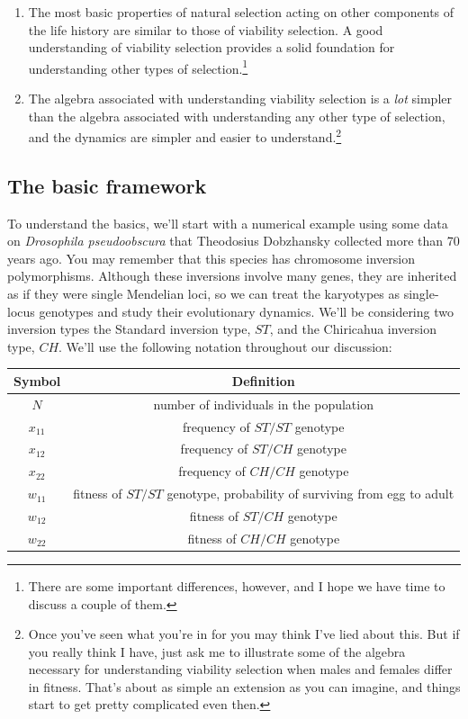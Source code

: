 \documentclass[12pt]{article}
\begin{document}
\begin{enumerate}

\item The most basic properties of natural selection acting on other
  components of the life history are similar to those of viability
  selection. A good understanding of viability selection provides a
  solid foundation for understanding other types of
  selection.\footnote{There are some important differences, however,
    and I hope we have time to discuss a couple of them.}

\item The algebra associated with understanding viability selection is
  a {\it lot\/} simpler than the algebra associated with understanding
  any other type of selection, and the dynamics are simpler and
  easier to understand.\footnote{Once you've seen what you're in for
    you may think I've lied about this. But if you really think I
    have, just ask me to illustrate some of the algebra necessary for
    understanding viability selection when males and females differ in
    fitness. That's about as simple an extension as you can imagine,
    and things start to get pretty complicated even then.}

\end{enumerate}

\subsection*{The basic framework}

To understand the basics, we'll start with a numerical example using
some data on {\it Drosophila pseudoobscura\/} that Theodosius
Dobzhansky collected more than 70 years ago. You may remember that
this species has chromosome inversion polymorphisms. Although these
inversions involve many genes, they are inherited as if they were
single Mendelian loci, so we can treat the karyotypes as single-locus
genotypes and study their evolutionary dynamics. We'll be considering
two inversion types the Standard inversion type, $ST$, and the
Chiricahua inversion type, $CH$. We'll use the following notation
throughout our discussion:

\begin{center}
\begin{tabular}{cc}
\hline\hline
Symbol  & Definition \\
\hline
$N$      & number of individuals in the population \\
$x_{11}$ & frequency of $ST/ST$ genotype \\
$x_{12}$ & frequency of $ST/CH$ genotype \\
$x_{22}$ & frequency of $CH/CH$ genotype \\
$w_{11}$ & fitness of $ST/ST$ genotype, probability of surviving from
           egg to adult \\
$w_{12}$ & fitness of $ST/CH$ genotype \\
$w_{22}$ & fitness of $CH/CH$ genotype \\
\hline
\end{tabular}
\end{center}
\end{document}
